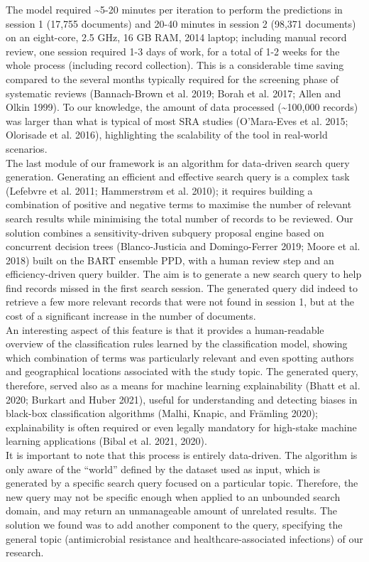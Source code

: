 \documentclass{article}
\begin{document}
The model required \textasciitilde5-20 minutes per iteration to perform
the predictions in session 1 (17,755 documents) and 20-40 minutes in
session 2 (98,371 documents) on an eight-core, 2.5 GHz, 16 GB RAM, 2014
laptop; including manual record review, one session required 1-3 days of
work, for a total of 1-2 weeks for the whole process (including record
collection). This is a considerable time saving compared to the several
months typically required for the screening phase of systematic reviews
(Bannach-Brown et al. 2019; Borah et al. 2017; Allen and Olkin 1999). To
our knowledge, the amount of data processed (\textasciitilde100,000
records) was larger than what is typical of most SRA studies
(O'Mara-Eves et al. 2015; Olorisade et al. 2016), highlighting the
scalability of the tool in real-world scenarios.\\

The last module of our framework is an algorithm for data-driven search
query generation. Generating an efficient and effective search query is
a complex task (Lefebvre et al. 2011; Hammerstrøm et al. 2010); it
requires building a combination of positive and negative terms to
maximise the number of relevant search results while minimising the
total number of records to be reviewed. Our solution combines a
sensitivity-driven subquery proposal engine based on concurrent decision
trees (Blanco-Justicia and Domingo-Ferrer 2019; Moore et al. 2018) built
on the BART ensemble PPD, with a human review step and an
efficiency-driven query builder. The aim is to generate a new search
query to help find records missed in the first search session. The
generated query did indeed to retrieve a few more relevant records that
were not found in session 1, but at the cost of a significant increase
in the number of documents.\\
An interesting aspect of this feature is that it provides a
human-readable overview of the classification rules learned by the
classification model, showing which combination of terms was
particularly relevant and even spotting authors and geographical
locations associated with the study topic. The generated query,
therefore, served also as a means for machine learning explainability
(Bhatt et al. 2020; Burkart and Huber 2021), useful for understanding
and detecting biases in black-box classification algorithms (Malhi,
Knapic, and Främling 2020); explainability is often required or even
legally mandatory for high-stake machine learning applications (Bibal et
al. 2021, 2020).\\
It is important to note that this process is entirely data-driven. The
algorithm is only aware of the ``world'' defined by the dataset used as
input, which is generated by a specific search query focused on a
particular topic. Therefore, the new query may not be specific enough
when applied to an unbounded search domain, and may return an
unmanageable amount of unrelated results. The solution we found was to
add another component to the query, specifying the general topic
(antimicrobial resistance and healthcare-associated infections) of our
research.\\
\end{document}
